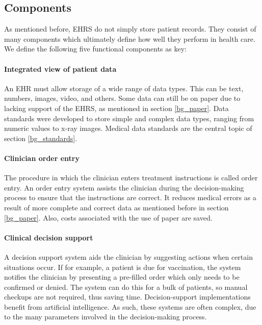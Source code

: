     \subsection{Components}\label{bg_components}

    As mentioned before, EHRS do not simply store patient records. They consist of many components which ultimately define how well they perform in health care. We define the following five functional components as key\cite{Shortliffe2014}:

    \paragraph{Integrated view of patient data} An EHR must allow storage of a wide range of data types. This can be text, numbers, images, video, and others. Some data can still be on paper due to lacking support of the EHRS, as mentioned in section \ref{bg_paper}. Data standards were developed to store simple and complex data types, ranging from numeric values to x-ray images. Medical data standards are the central topic of section \ref{bg_standards}. %

    \paragraph{Clinician order entry} The procedure in which the clinician enters treatment instructions is called order entry. An order entry system assists the clinician during the decision-making process to ensure that the instructions are correct. It reduces medical errors as a result of more complete and correct data as mentioned before in section \ref{bg_paper}. Also, costs associated with the use of paper are saved. %

    \paragraph{Clinical decision support} A decision support system aids the clinician by suggesting actions when certain situations occur. If for example, a patient is due for vaccination, the system notifies the clinician by presenting a pre-filled order which only needs to be confirmed or denied. The system can do this for a bulk of patients, so manual checkups are not required, thus saving time. Decision-support implementations benefit from artificial intelligence. As such, these systems are often complex, due to the many parameters involved in the decision-making process.

